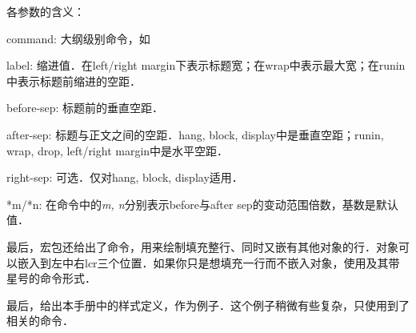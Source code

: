 各参数的含义：
\begin{para}
\item[command:] 大纲级别命令，如
\item[label:] 缩进值．在left/right margin下表示标题宽；在wrap中表示最大宽；在runin中表示标题前缩进的空距．
\item[before-sep:] 标题前的垂直空距．
\item[after-sep:] 标题与正文之间的空距．hang, block, display中是垂直空距；runin, wrap, drop, left/right margin中是水平空距．
\item[right-sep:] 可选．仅对hang, block, display适用．
\item[*m/*n:] 在命令中的\textit{m, n}分别表示before与after sep的变动范围倍数，基数是默认值．
\end{para}

最后，宏包还给出了命令，用来绘制填充整行、同时又嵌有其他对象的行．对象可以嵌入到左中右lcr三个位置．如果你只是想填充一行而不嵌入对象，使用及其带星号的命令形式．
\begin{latex}
\end{latex}

最后，给出本手册中的样式定义，作为例子．这个例子稍微有些复杂，只使用到了相关的命令．

